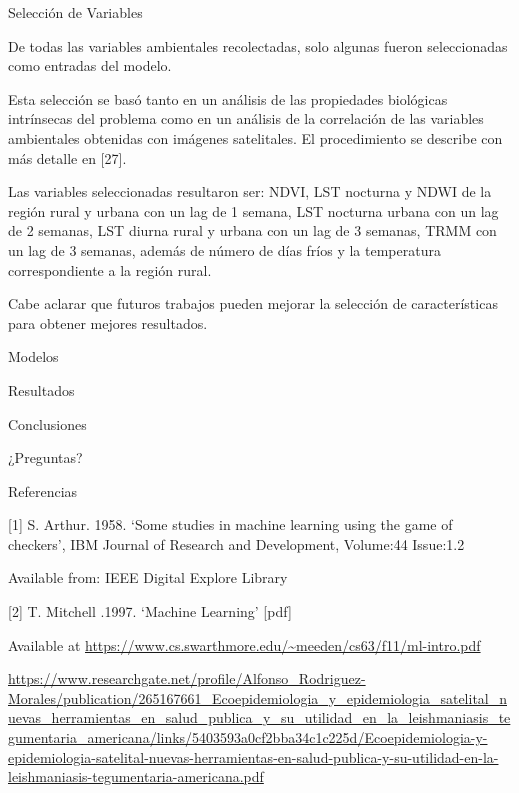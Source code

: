 \documentclass[10pt]{beamer}
\begin{document}
\begin{frame}{Selección de Variables}

De todas las variables ambientales recolectadas, solo algunas fueron
seleccionadas como entradas del modelo.

Esta selección se basó tanto en un análisis de las propiedades biológicas
intrínsecas del problema como en un análisis de la correlación de las variables
ambientales obtenidas con imágenes satelitales. El procedimiento se describe con
más detalle en [27].

Las variables seleccionadas resultaron ser: NDVI, LST nocturna y NDWI de la
región rural y urbana con un lag de 1 semana, LST nocturna urbana con un lag de
2 semanas, LST diurna rural y urbana con un lag de 3 semanas, TRMM con un lag de
3 semanas, además de número de días fríos y la temperatura correspondiente a la
región rural.


Cabe aclarar que futuros trabajos pueden mejorar la selección de características
para obtener mejores resultados.

\end{frame}

\begin{frame}{Modelos}

\end{frame}

\begin{frame}{Resultados}

\end{frame}

\begin{frame}{Conclusiones}

\end{frame}

\begin{frame}[standout]
  ¿Preguntas?
\end{frame}

\appendix

\begin{frame}{Referencias}

[1] S. Arthur. 1958. ‘Some studies in machine learning using the game of
checkers', IBM Journal of Research and Development, Volume:44 Issue:1.2

Available from: IEEE Digital Explore Library

[2] T. Mitchell .1997. ‘Machine Learning’ [pdf]

Available at \url{https://www.cs.swarthmore.edu/~meeden/cs63/f11/ml-intro.pdf}

  \url{https://www.researchgate.net/profile/Alfonso_Rodriguez-Morales/publication/265167661_Ecoepidemiologia_y_epidemiologia_satelital_nuevas_herramientas_en_salud_publica_y_su_utilidad_en_la_leishmaniasis_tegumentaria_americana/links/5403593a0cf2bba34c1c225d/Ecoepidemiologia-y-epidemiologia-satelital-nuevas-herramientas-en-salud-publica-y-su-utilidad-en-la-leishmaniasis-tegumentaria-americana.pdf}

\end{frame}
\end{document}
